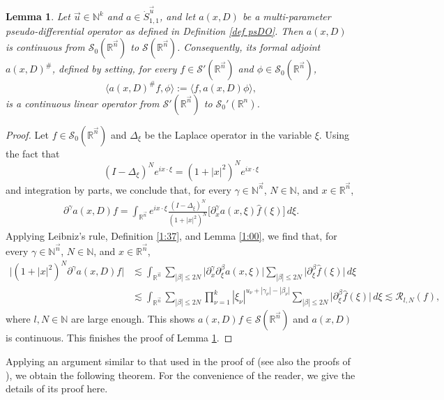 \documentclass[11pt, reqno]{amsart}
\newtheorem{lemma}[theorem]{Lemma}
\theoremstyle{definition}
\theoremstyle{remark}
\numberwithin{equation}{section}
\newcommand{\N}{\mathbb N}
\newcommand{\R}{\mathbb R}
\newcommand{\vn}{\vec n}
\newcommand{\vu}{\vec u}
\begin{document}
\begin{lemma}\label{2223}
Let $\vu\in\mathbb N^k$ and $a\in\dot{S}_{1,1}^{\vu}$,
and let $a(x, D)$ be a multi-parameter pseudo-differential operator as defined in
Definition \ref{def psDO}. Then $a(x, D)$ is continuous from
$\mathscr{S}_0(\R^{\vec n})$ to $\mathscr{S}(\R^{\vn})$.
Consequently, its formal adjoint $a(x,D)^{\#}$, defined by setting,
for every $f\in\mathscr{S}'(\R^{\vn})$ and $\phi\in\mathscr{S}_0(\R^{\vec n})$,
$$
\Big\langle a(x,D)^{\#}f,\phi\Big\rangle
:=\langle f,a(x,D)\phi\rangle,
$$
is a continuous linear operator from $\mathscr{S}'(\R^{\vn})$ to $\mathscr{S}_0'(\R^{n})$.
\end{lemma}

\begin{proof}
Let $f\in\mathscr{S}_0(\R^{\vn})$ and $\Delta_\xi$ be the Laplace operator in the
variable $\xi$. Using the fact that
$$(I-\Delta_\xi)^Ne^{ix\cdot\xi}=(1+|x|^2)^Ne^{ix\cdot\xi}
$$
and integration by parts, we conclude that, for
every $\gamma \in \N^{\vn}$, $N\in\N$, and $x\in\R^{\vn}$,
\begin{align*}
\partial^\gamma a(x,D)f=\int_{\R^{\vn}}e^{ix\cdot\xi}
\frac{(I-\Delta_\xi)^N}{(1+|x|^2)^N}\Big[\partial^\gamma_x
a(x,\xi)\widehat{f}(\xi)\Big]\,d\xi.
\end{align*}
Applying Leibniz's rule, Definition \ref{1:37}, and Lemma \ref{1:00},
we find that, for every $\gamma \in \N^{\vn}$, $N\in\N$, and $x\in\R^{\vn}$,
\begin{align*}
\Big| (1+|x|^2)^N\partial^\gamma a(x,D)f \Big|
&\lesssim
\int_{\R^{\vn}}\sum_{|\beta|\le 2N}\Big|
\partial^\gamma_x\partial^\beta_\xi a(x,\xi)\Big|\sum_{|\beta|\le 2N}
\Big|\partial^\beta_\xi\widehat{f}(\xi)\Big|\,d\xi\\
&\lesssim\int_{\R^{\vn}}\sum_{|\beta|\le 2N}
\prod_{\nu=1}^{k}|\xi_\nu|^{u_\nu+|\gamma_\nu|-|\beta_\nu|}
\sum_{|\beta|\le 2N}
\Big|\partial^\beta_\xi\widehat{f}(\xi)\Big|\,d\xi
\lesssim\mathcal R_{l,N}(f),
\end{align*}
where $l,N\in\N$ are large enough.
This shows $a(x,D)f\in\mathscr S(\R^{\vn})$ and
$a(x,D)$ is continuous. This finishes the proof of Lemma \ref{2223}.
\end{proof}

Applying an argument similar to that used in the proof of
\cite[Theorem 1.5]{SYY10} (see also the proofs of \cite[Theorems 1.1 and 1.2]{GT99}),
we obtain the following theorem.
For the convenience of the reader, we give the details of its proof here.
\end{document}
